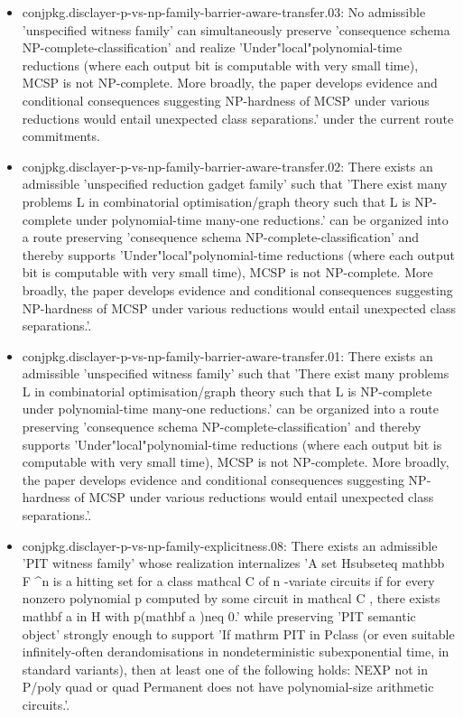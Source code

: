 \documentclass[11pt]{article}
\begin{document}
\begin{itemize}
\item conjpkg.disclayer-p-vs-np-family-barrier-aware-transfer.03: No admissible 'unspecified witness family' can simultaneously preserve 'consequence schema NP-complete-classification' and realize 'Under"local"polynomial-time reductions (where each output bit is computable with very small time), MCSP is not NP-complete. More broadly, the paper develops evidence and conditional consequences suggesting NP-hardness of MCSP under various reductions would entail unexpected class separations.' under the current route commitments.
\item conjpkg.disclayer-p-vs-np-family-barrier-aware-transfer.02: There exists an admissible 'unspecified reduction gadget family' such that 'There exist many problems L in combinatorial optimisation/graph theory such that L is NP-complete under polynomial-time many-one reductions.' can be organized into a route preserving 'consequence schema NP-complete-classification' and thereby supports 'Under"local"polynomial-time reductions (where each output bit is computable with very small time), MCSP is not NP-complete. More broadly, the paper develops evidence and conditional consequences suggesting NP-hardness of MCSP under various reductions would entail unexpected class separations.'.
\item conjpkg.disclayer-p-vs-np-family-barrier-aware-transfer.01: There exists an admissible 'unspecified witness family' such that 'There exist many problems L in combinatorial optimisation/graph theory such that L is NP-complete under polynomial-time many-one reductions.' can be organized into a route preserving 'consequence schema NP-complete-classification' and thereby supports 'Under"local"polynomial-time reductions (where each output bit is computable with very small time), MCSP is not NP-complete. More broadly, the paper develops evidence and conditional consequences suggesting NP-hardness of MCSP under various reductions would entail unexpected class separations.'.
\item conjpkg.disclayer-p-vs-np-family-explicitness.08: There exists an admissible 'PIT witness family' whose realization internalizes 'A set Hsubseteq mathbb F \textasciicircum{}n is a hitting set for a class mathcal C of n -variate circuits if for every nonzero polynomial p computed by some circuit in mathcal C , there exists mathbf a in H with p(mathbf a )neq 0.' while preserving 'PIT semantic object' strongly enough to support 'If mathrm PIT in Pclass (or even suitable infinitely-often derandomisations in nondeterministic subexponential time, in standard variants), then at least one of the following holds: NEXP not in P/poly quad or quad Permanent does not have polynomial-size arithmetic circuits.'.

\end{itemize}
\end{document}

